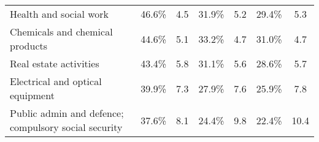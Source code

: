 \documentclass[10pt]{article}
\begin{document}
\begin{table}[!h]
{\begin{tabular}{l|cc|cc|cc}
\rowcolor[HTML]{EFEFEF} 
{\color[HTML]{333333} Health and social work}                                                             & {\color[HTML]{333333} 46.6\%}                                             & {\color[HTML]{333333} 4.5}                                           & {\color[HTML]{333333} 31.9\%}                                             & {\color[HTML]{333333} 5.2}                                           & {\color[HTML]{333333} 29.4\%}                                             & {\color[HTML]{333333} 5.3}                                           \\
\rowcolor[HTML]{FFFFFF} 
{\color[HTML]{333333} Chemicals and chemical products}                                                    & {\color[HTML]{333333} 44.6\%}                                             & {\color[HTML]{333333} 5.1}                                           & {\color[HTML]{333333} 33.2\%}                                             & {\color[HTML]{333333} 4.7}                                           & {\color[HTML]{333333} 31.0\%}                                             & {\color[HTML]{333333} 4.7}                                           \\
\rowcolor[HTML]{FFFFFF} 
{\color[HTML]{333333} Real estate activities}                                                             & {\color[HTML]{333333} 43.4\%}                                             & {\color[HTML]{333333} 5.8}                                           & {\color[HTML]{333333} 31.1\%}                                             & {\color[HTML]{333333} 5.6}                                           & {\color[HTML]{333333} 28.6\%}                                             & {\color[HTML]{333333} 5.7}                                           \\
\rowcolor[HTML]{FFFFFF} 
{\color[HTML]{333333} Electrical and optical equipment}                                                   & {\color[HTML]{333333} 39.9\%}                                             & {\color[HTML]{333333} 7.3}                                           & {\color[HTML]{333333} 27.9\%}                                             & {\color[HTML]{333333} 7.6}                                           & {\color[HTML]{333333} 25.9\%}                                             & {\color[HTML]{333333} 7.8}                                           \\
\rowcolor[HTML]{FFFFFF} 
{\color[HTML]{333333} Public admin and defence; compulsory social security}                               & {\color[HTML]{333333} 37.6\%}                                             & {\color[HTML]{333333} 8.1}                                           & {\color[HTML]{333333} 24.4\%}                                             & {\color[HTML]{333333} 9.8}                                           & {\color[HTML]{333333} 22.4\%}                                             & {\color[HTML]{333333} 10.4}                                          \\

\end{tabular}}
\end{table}
\end{document}
